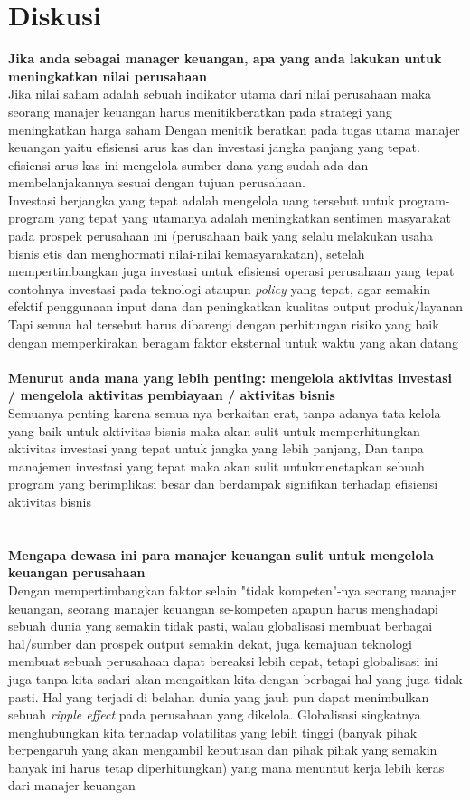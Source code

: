 \documentclass{article}
\begin{document}
\section*{Diskusi}
\textbf{Jika anda sebagai manager  keuangan, apa yang anda lakukan untuk meningkatkan nilai perusahaan}\\
Jika nilai saham adalah sebuah indikator utama dari nilai perusahaan 
maka seorang manajer keuangan harus menitikberatkan pada strategi yang meningkatkan harga saham
Dengan menitik beratkan pada tugas utama manajer keuangan 
yaitu efisiensi arus kas dan investasi jangka panjang yang tepat.\\
efisiensi arus kas ini mengelola sumber dana yang sudah ada 
dan membelanjakannya sesuai dengan tujuan perusahaan.\\ 
Investasi berjangka yang tepat adalah mengelola uang tersebut untuk program-program yang tepat yang utamanya 
adalah meningkatkan sentimen masyarakat pada prospek perusahaan ini (perusahaan baik yang selalu melakukan usaha bisnis etis dan menghormati nilai-nilai kemasyarakatan),  
setelah mempertimbangkan juga investasi untuk 
efisiensi operasi perusahaan yang tepat contohnya 
investasi pada teknologi ataupun \emph{policy} yang tepat, agar semakin efektif penggunaan input dana dan peningkatkan kualitas output produk/layanan\\ 
Tapi semua hal tersebut harus dibarengi dengan perhitungan risiko yang baik dengan memperkirakan beragam faktor eksternal untuk waktu yang akan datang
\\\\
\textbf{Menurut anda mana yang lebih penting: mengelola aktivitas investasi / mengelola aktivitas pembiayaan / aktivitas bisnis}\\
Semuanya penting karena semua nya berkaitan erat, 
tanpa adanya tata kelola yang baik untuk aktivitas bisnis maka akan sulit 
untuk memperhitungkan aktivitas investasi yang tepat untuk jangka yang lebih panjang, Dan tanpa manajemen investasi yang tepat maka akan sulit untukmenetapkan sebuah program yang berimplikasi besar dan berdampak signifikan terhadap efisiensi aktivitas bisnis\\
\\
\\
\textbf{Mengapa dewasa ini para manajer keuangan sulit  untuk mengelola keuangan perusahaan}\\
Dengan mempertimbangkan faktor selain "tidak kompeten"-nya seorang manajer keuangan, seorang manajer keuangan se-kompeten apapun harus menghadapi sebuah dunia yang semakin tidak pasti, walau globalisasi membuat berbagai hal/sumber dan prospek output semakin dekat, juga kemajuan teknologi membuat sebuah perusahaan dapat bereaksi lebih cepat, tetapi globalisasi ini juga tanpa kita sadari akan mengaitkan kita dengan berbagai hal yang juga tidak pasti. 
Hal yang terjadi di belahan dunia yang jauh pun dapat menimbulkan sebuah \emph{ripple effect} pada perusahaan yang dikelola.   
Globalisasi singkatnya menghubungkan kita terhadap volatilitas yang lebih tinggi (banyak pihak berpengaruh yang akan mengambil keputusan dan pihak pihak yang semakin banyak ini harus tetap diperhitungkan) 
yang mana menuntut kerja lebih keras dari manajer keuangan
\\
\end{document}
